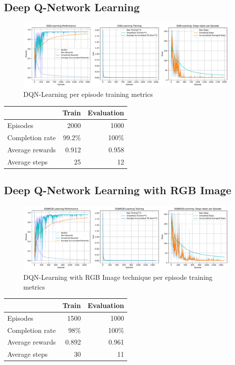 \subsection{Deep Q-Network Learning}
\begin{figure}[H]
	\centering
	\includegraphics[width=\linewidth]{figures/DQNLearning_episode.pdf}
	\caption{DQN-Learning per episode training metrics}
\end{figure}
\begin{table}
	\centering
	\begin{tabular}{@{}lrr@{}}
		\cmidrule(l){2-3}
		& Train & Evaluation \\ \midrule
		Episodes        &  2000      &  1000          \\
		Completion rate &   99.2\%    &  100\%           \\
		Average rewards &   0.912    &    0.958        \\
		Average steps   &    25   &     12       \\ \bottomrule
	\end{tabular}
\end{table}

\subsection{Deep Q-Network Learning with RGB Image}
\begin{figure}[H]
	\centering
	\includegraphics[width=\linewidth]{figures/DQNRGBLearning_episode.pdf}
	\caption{DQN-Learning with RGB Image technique per episode training metrics}
\end{figure}
\begin{table}
	\centering
	\begin{tabular}{@{}lrr@{}}
		\cmidrule(l){2-3}
		& Train & Evaluation \\ \midrule
		Episodes        &  1500      &  1000          \\
		Completion rate &   98\%    &  100\%           \\
		Average rewards &   0.892    &    0.961        \\
		Average steps   &    30   &     11       \\ \bottomrule
	\end{tabular}
\end{table}

